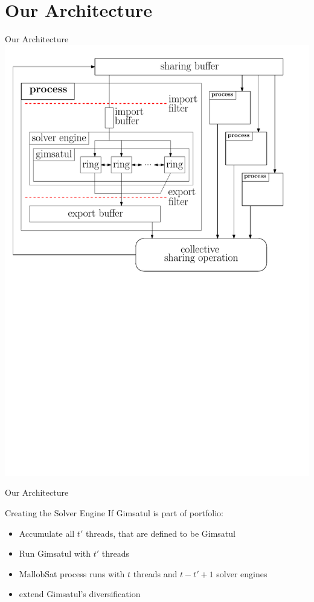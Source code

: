 \documentclass[]{sdqbeamer}
\begin{document}
\section{Our Architecture}
\begin{frame}{Our Architecture}
    \center
    \includegraphics[scale=.8]{figures/architecture.pdf}
\end{frame}

\begin{frame}{Our Architecture}
    \begin{block}{Creating the Solver Engine}
        If Gimsatul is part of portfolio:
        \begin{itemize}
            \item Accumulate all $t'$ threads, that are defined to be Gimsatul
            \item Run Gimsatul with $t'$ threads
            \item MallobSat process runs with $t$ threads and $t - t' + 1$ solver engines
            \item extend Gimsatul's diversification
        \end{itemize}
    \end{block}
\end{frame}
\end{document}
